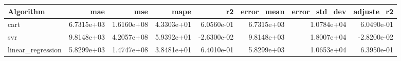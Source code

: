 \begin{tabular}{lrrrrrrr}
\toprule
Algorithm & mae & mse & mape & r2 & error_mean & error_std_dev & adjuste_r2 \\
\midrule
cart & 6.7315e+03 & 1.6160e+08 & 4.3303e+01 & 6.0560e-01 & 6.7315e+03 & 1.0784e+04 & 6.0490e-01 \\
svr & 9.8148e+03 & 4.2057e+08 & 5.9392e+01 & -2.6300e-02 & 9.8148e+03 & 1.8007e+04 & -2.8200e-02 \\
linear_regression & 5.8299e+03 & 1.4747e+08 & 3.8481e+01 & 6.4010e-01 & 5.8299e+03 & 1.0653e+04 & 6.3950e-01 \\
\bottomrule
\end{tabular}
